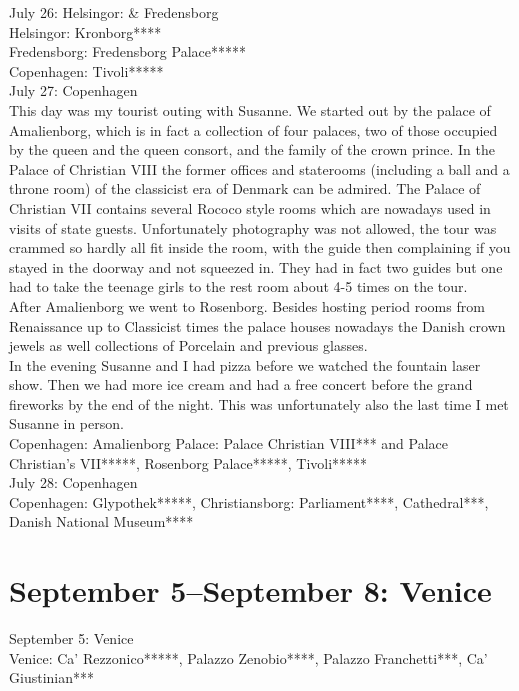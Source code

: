 July 26: Helsingor:  \& Fredensborg\\
Helsingor: Kronborg****\\
Fredensborg: Fredensborg Palace*****\\
Copenhagen: Tivoli*****\\

July 27: Copenhagen\\
This day was my tourist outing with Susanne. We started out by the palace of Amalienborg, which is in fact a collection of four palaces, two of those occupied by the queen and the queen consort, and the family of the crown prince. In the Palace of Christian VIII the former offices and staterooms (including a ball and a throne room) of the classicist era of Denmark can be admired. The Palace of Christian VII contains several Rococo style rooms which are nowadays used in visits of state guests. Unfortunately photography was not allowed, the tour was crammed so hardly all fit inside the room, with the guide then complaining if you stayed in the doorway and not squeezed in. They had in fact two guides but one had to take the teenage girls to the rest room about 4-5 times on the tour.\\
After Amalienborg we went to Rosenborg. Besides hosting period rooms from Renaissance up to Classicist times the palace houses nowadays the Danish crown jewels as well collections of Porcelain and previous glasses. \\
In the evening Susanne and I had pizza before we watched the fountain laser show. Then we had more ice cream and had a free concert before the grand fireworks by the end of the night. This was unfortunately also the last time I met Susanne in person.\\

Copenhagen: Amalienborg Palace: Palace Christian VIII*** and Palace Christian's VII*****, Rosenborg Palace*****, Tivoli*****\\

July 28: Copenhagen\\
Copenhagen: Glypothek*****, Christiansborg: Parliament****, Cathedral***, Danish National Museum****

\section{September 5--September 8: Venice}
\label{Venice2013}

September 5: Venice\\
Venice: Ca' Rezzonico*****, Palazzo Zenobio****, Palazzo Franchetti***, Ca' Giustinian***\\

